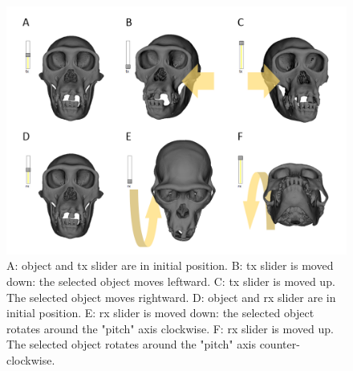 \begin{figure}
  \centering
  \includegraphics[scale=0.45]{images/06/objects/move_objects_x.png} 
	\caption{A: object and tx slider are in initial position. B: tx slider is moved down: the selected object moves leftward. C: tx slider is moved up. The selected object moves rightward. D: object and rx slider are in initial position. E: rx slider is moved down: the selected object rotates around the "pitch" axis clockwise. F: rx slider is moved up. The selected object rotates around the "pitch" axis counter-clockwise.}
\label{move_x}
 
\end{figure}